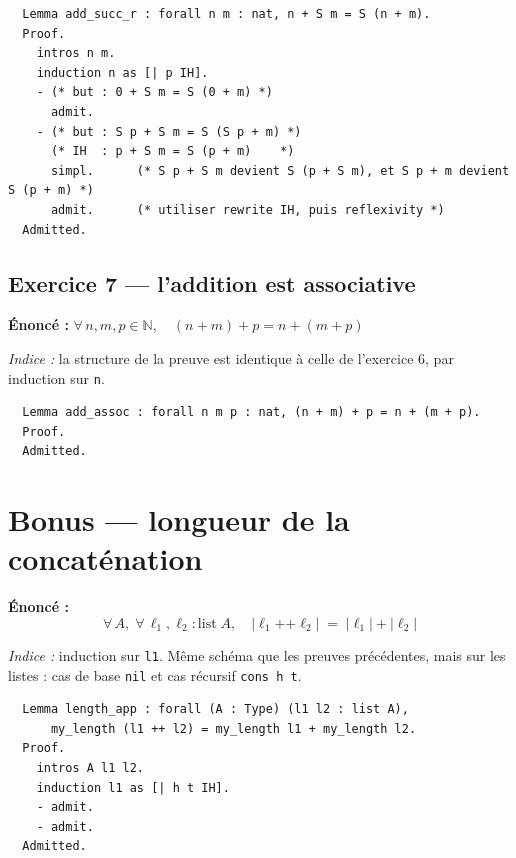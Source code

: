 \documentclass[11pt,a4paper]{article}
\newenvironment{exo}{
\begin{mdframed}[style=exostyle]}{
\end{mdframed}}
\newenvironment{bonus}{
\begin{mdframed}[style=bonusstyle]}{
\end{mdframed}}
\newcommand{\cq}[1]{\texttt{#1}}
\begin{document}
\begin{exo}
\begin{verbatim}
  Lemma add_succ_r : forall n m : nat, n + S m = S (n + m).
  Proof.
    intros n m.
    induction n as [| p IH].
    - (* but : 0 + S m = S (0 + m) *)
      admit.
    - (* but : S p + S m = S (S p + m) *)
      (* IH  : p + S m = S (p + m)    *)
      simpl.      (* S p + S m devient S (p + S m), et S p + m devient S (p + m) *)
      admit.      (* utiliser rewrite IH, puis reflexivity *)
  Admitted.
\end{verbatim}
\end{exo}

\subsection{Exercice 7 — l'addition est associative}

\textbf{Énoncé :} $\forall\, n, m, p \in \mathbb{N},\quad (n+m)+p = n+(m+p)$

\textit{Indice :} la structure de la preuve est identique à celle de
l'exercice 6, par induction sur \cq{n}.

\begin{exo}
\begin{verbatim}
  Lemma add_assoc : forall n m p : nat, (n + m) + p = n + (m + p).
  Proof.
  Admitted.
\end{verbatim}
\end{exo}

\section*{Bonus — longueur de la concaténation}

\begin{bonus}
  \textbf{Énoncé :}
  \[
    \forall\, A,\; \forall\, \ell_1, \ell_2 : \mathrm{list}\;A,\quad
    |\ell_1 \mathbin{\texttt{++}} \ell_2| \;=\; |\ell_1| + |\ell_2|
  \]

  \textit{Indice :} induction sur \cq{l1}.
  Même schéma que les preuves précédentes, mais sur les listes :
  cas de base \cq{nil} et cas récursif \cq{cons h t}.

\begin{verbatim}
  Lemma length_app : forall (A : Type) (l1 l2 : list A),
      my_length (l1 ++ l2) = my_length l1 + my_length l2.
  Proof.
    intros A l1 l2.
    induction l1 as [| h t IH].
    - admit.
    - admit.
  Admitted.
\end{verbatim}
\end{bonus}
\end{document}
